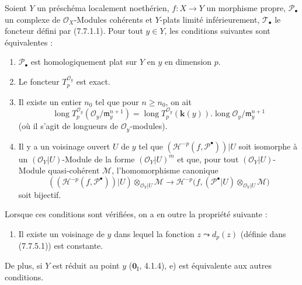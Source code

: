 \begin{proposition}[7.8.4]
Soient $Y$ un préschéma localement noethérien, $f:X\to Y$ un morphisme propre,
$\mathscr P_\bullet$ un complexe de $\mathscr O_X$-Modules cohérents et $Y$-plats
limité inférieurement, $\mathscr T_\bullet$ le foncteur défini par \textup{(7.7.1.1)}.
Pour tout $y\in Y$, les conditions suivantes sont équivalentes :
\begin{enumerate}
  \item[\textup{a)}] $\mathscr P_\bullet$ est homologiquement plat sur $Y$ en $y$ en
    dimension $p$.
  \item[\textup{b)}] Le foncteur $T_p^{\mathscr O_y}$ est exact.
  \item[\textup{c)}] Il existe un entier $n_0$ tel que pour $n\geq n_0$, on ait
    \[
      \operatorname{long}T_p^{\mathscr O_y}
        (\mathscr O_y/\mathfrak m_y^{n+1})
      =
      \operatorname{long}T_p^{\mathscr O_y}(\boldsymbol{k}(y))
      .
      \operatorname{long}\mathscr O_y/\mathfrak m_y^{n+1}
      \tag{7.8.4.1}\label{III.7.8.4.1.fr}
    \]
    (où il s'agit de longueurs de $\mathscr O_y$-modules).
  \item[\textup{d)}] Il y a un voisinage ouvert $U$ de $y$ tel que
    $(\mathcal H^{-p}(f,\mathscr P^\bullet))|U$ soit isomorphe à un
    $(\mathscr O_Y|U)$-Module de la forme $(\mathscr O_Y|U)^m$ et que, pour tout
    $(\mathscr O_Y|U)$-Module quasi-cohérent $\mathscr M$, l'homomorphisme
    canonique
    \[
      ((\mathcal H^{-p}(f,\mathscr P^\bullet))|U)
      \otimes_{\mathscr O_Y|U}\mathscr M
      \longrightarrow
      \mathcal H^{-p}
      \bigl(
        f,(\mathscr P^\bullet|U)
          \otimes_{\mathscr O_Y|U}\mathscr M
      \bigr)
      \tag{7.8.4.2}\label{III.7.8.4.2.fr}
    \]
    soit bijectif.
\end{enumerate}

Lorsque ces conditions sont vérifiées, on a en outre la propriété suivante :
\begin{enumerate}
  \item[\textup{e)}] Il existe un voisinage de $y$ dans lequel la fonction
    $z\leadsto d_p(z)$ \textup{(définie dans (7.7.5.1))} est constante.
\end{enumerate}

De plus, si $Y$ est \textup{réduit} au point $y$ \textup{($\mathbf{0}_{\mathrm I}$, 4.1.4)}, e) est
équivalente aux autres conditions.
\end{proposition}

